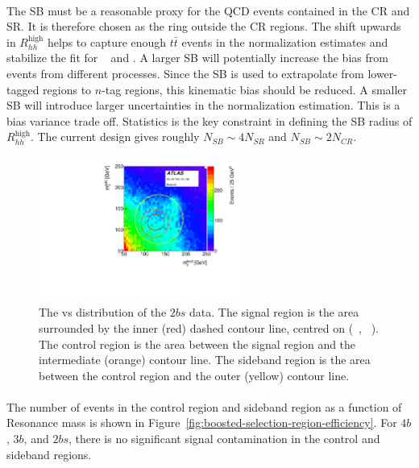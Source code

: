 \paragraph{}
The SB must be a reasonable proxy for the QCD events contained in the CR and SR.
It is therefore chosen as the ring outside the CR regions.
The shift upwards in $R_{hh}^{\text{high}}$ helps to capture enough $t\bar{t}$ events in the normalization estimates and stabilize the fit for \muqcd~ and \alphatt.
A larger SB will potentially increase the bias from events from different processes.
Since the SB is used to extrapolate from lower-tagged regions to $n$-tag regions, this kinematic bias should be reduced.
A smaller SB will introduce larger uncertainties in the normalization estimation.
This is a bias variance trade off.
Statistics is the key constraint in defining the SB radius of $R_{hh}^{\text{high}}$.
The current design gives roughly $N_{SB} \sim 4 N_{SR}$ and $N_{SB} \sim 2 N_{CR}$.

\begin{figure}[htbp!]
\begin{center}
  \includegraphics[width=0.6\textwidth,angle=-90]{figures/boosted/Other/TwoTag_split_Incl_data_mH0H1.pdf}
  \caption{The \mleadJ vs \msublJ distribution of the $2bs$ data. The signal region is the area surrounded by the inner (red) dashed contour line, centred on (~\GeV, ~\GeV). The control region is the area between the signal region and the intermediate (orange) contour line. The sideband region is the area between the control region and the outer (yellow) contour line.}
  \label{fig:boosted-region-def}
\end{center}
\end{figure}

\paragraph{}
The number of events in the control region and sideband region as a function of Resonance mass is shown in Figure~\ref{fig:boosted-selection-region-efficiency}. 
For $4b$, $3b$, and $2bs$, there is no significant signal contamination in the control and sideband regions.

